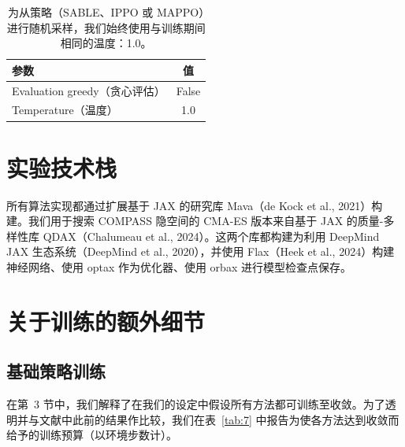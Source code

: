 \documentclass[11pt,UTF8,fontset=fandol]{ctexart}
\begin{document}
\begin{table}[H]\centering
\caption{为从策略（SABLE、IPPO 或 MAPPO）进行随机采样，我们始终使用与训练期间相同的温度：1.0。}
\label{tab:6}
\begin{tabular}{lc}
\toprule
参数 & 值\\
\midrule
Evaluation greedy（贪心评估） & False\\
Temperature（温度） & 1.0\\
\bottomrule
\end{tabular}
\end{table}

\section{实验技术栈}

所有算法实现都通过扩展基于 JAX 的研究库 Mava（de Kock et al., 2021）构建。我们用于搜索 COMPASS 隐空间的 CMA-ES 版本来自基于 JAX 的质量-多样性库 QDAX（Chalumeau et al., 2024）。这两个库都构建为利用 DeepMind JAX 生态系统（DeepMind et al., 2020），并使用 Flax（Heek et al., 2024）构建神经网络、使用 optax 作为优化器、使用 orbax 进行模型检查点保存。

\section{关于训练的额外细节}

\subsection{基础策略训练}

在第~3 节中，我们解释了在我们的设定中假设所有方法都可训练至收敛。为了透明并与文献中此前的结果作比较，我们在表~\ref{tab:7} 中报告为使各方法达到收敛而给予的训练预算（以环境步数计）。
\end{document}
